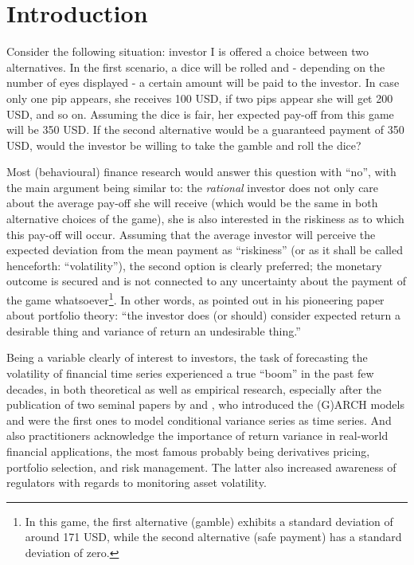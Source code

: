 \section{Introduction}
\label{sec: introduction}
Consider the following situation: investor I is offered a choice between two alternatives. In the first scenario, a dice will be rolled and - depending on the number of eyes displayed - a certain amount will be paid to the investor. In case only one pip appears, she receives 100 USD, if two pips appear she will get 200 USD, and so on. Assuming the dice is fair, her expected pay-off from this game will be 350 USD. If the second alternative would be a guaranteed payment of 350 USD, would the investor be willing to take the gamble and roll the dice?


Most (behavioural) finance research would answer this question with \enquote{no}, with the main argument being similar to: the \textit{rational} investor does not only care about the average pay-off she will receive (which would be the same in both alternative choices of the game), she is also interested in the riskiness as to which this pay-off will occur. Assuming that the average investor will perceive the expected deviation from the mean payment as \enquote{riskiness} (or as it shall be called henceforth: \enquote{volatility}), the second option is clearly preferred; the monetary outcome is secured and is not connected to any uncertainty about the payment of the game whatsoever\footnote{In this game, the first alternative (gamble) exhibits a standard deviation of around 171 USD, while the second alternative (safe payment) has a standard deviation of zero.}. In other words, as \textcite[77]{Markowitz1952} pointed out in his pioneering paper about portfolio theory: \enquote{the investor does (or should) consider expected return a desirable thing and variance of return an undesirable thing.}

Being a variable clearly of interest to investors, the task of forecasting the volatility of financial time series experienced a true \enquote{boom} in the past few decades, in both theoretical as well as empirical research, especially after the publication of two seminal papers by \textcite{Engle1982} and \textcite{Bollerslev1986}, who introduced the (G)ARCH models and were the first ones to model conditional variance series as time series. And also practitioners acknowledge the importance of return variance in real-world financial applications, the most famous probably being derivatives pricing, portfolio selection, and risk management. The latter also increased awareness of regulators with regards to monitoring asset volatility.

